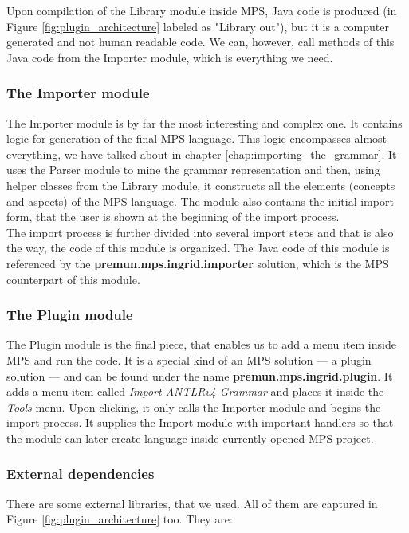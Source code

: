 Upon compilation of the Library module inside MPS, Java code is produced (in Figure \ref{fig:plugin_architecture} labeled as "Library out"), but it is a computer generated and not human readable code.
We can, however, call methods of this Java code from the Importer module, which is everything we need.

\subsubsection{The Importer module}

The Importer module is by far the most interesting and complex one.
It contains logic for generation of the final MPS language.
This logic encompasses almost everything, we have talked about in chapter \ref{chap:importing_the_grammar}.
It uses the Parser module to mine the grammar representation and then, using helper classes from the Library module, it constructs all the elements (concepts and aspects) of the MPS language.
The module also contains the initial import form, that the user is shown at the beginning of the import process.
\\

The import process is further divided into several import steps and that is also the way, the code of this module is organized.
The Java code of this module is referenced by the \textbf{premun.mps.ingrid.importer} solution, which is the MPS counterpart of this module.

\subsubsection{The Plugin module}

The Plugin module is the final piece, that enables us to add a menu item inside MPS and run the code.
It is a special kind of an MPS solution --- a plugin solution --- and can be found under the name \textbf{premun.mps.ingrid.plugin}.
It adds a menu item called \textit{Import ANTLRv4 Grammar} and places it inside the \textit{Tools} menu.
Upon clicking, it only calls the Importer module and begins the import process.
It supplies the Import module with important handlers so that the module can later create language inside currently opened MPS project.

\subsubsection{External dependencies}

There are some external libraries, that we used.
All of them are captured in Figure \ref{fig:plugin_architecture} too.
They are:

